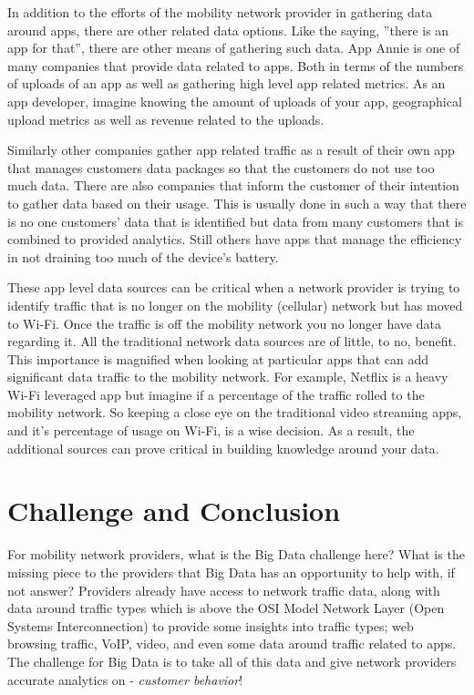 \documentclass[sigconf]{acmart}
\begin{document}
In addition to the efforts of the mobility network provider in gathering data around apps, there are other related data options.  Like the saying, ''there is an app for that'', there are other means of gathering such data.  App Annie is one of many companies that provide data related to apps.  Both in terms of the numbers of uploads of an app as well as gathering high level app related metrics. As an app developer, imagine knowing the amount of uploads of your app, geographical upload metrics as well as revenue related to the uploads.   

Similarly other companies gather app related traffic as a result of their own app that manages customers data packages so that the customers do not use too much data.  There are also companies that inform the customer of their intention to gather data based on their usage.  This is usually done in such a way that there is no one customers' data that is identified but data from many customers that is combined to provided analytics.  Still others have apps that manage the efficiency in not draining too much of the device's battery. 

These app level data sources can be critical when a network provider is trying to identify traffic that is no longer on the mobility (cellular) network but has moved to Wi-Fi.  Once the traffic is off the mobility network you no longer have data regarding it.  All the traditional network data sources are of little, to no, benefit.  This importance is magnified when looking at particular apps that can add significant data traffic to the mobility network.  For example, Netflix is a heavy Wi-Fi leveraged app but imagine if a percentage of the traffic rolled to the mobility network.  So keeping a close eye on the traditional video streaming apps, and it's percentage of usage on Wi-Fi, is a wise decision. As a result, the additional sources can prove critical in building knowledge around your data.



\section{Challenge and Conclusion}

For mobility network providers, what is the Big Data challenge here?  What is the missing piece to the providers that Big Data has an opportunity to help with, if not answer?  Providers already have access to network traffic data, along with data around traffic types which is above the OSI Model Network Layer (Open Systems Interconnection) to provide some insights into traffic types; web browsing traffic, VoIP, video, and even some data around traffic related to apps.  The challenge for Big Data is to take all of this data and give network providers accurate analytics on - {\em customer behavior}!  
\end{document}
